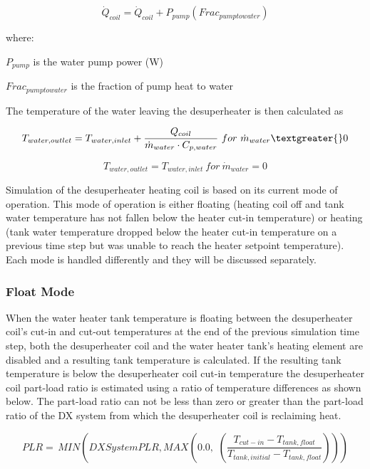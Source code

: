 \begin{equation}
{\dot Q_{coil}} = {\dot Q_{coil}} + {P_{pump}}\left( {Fra{c_{pumptowater}}} \right)
\end{equation}

where:

\({P_{pump}}\) is the water pump power (W)

\(Fra{c_{pumptowater}}\) is the fraction of pump heat to water

The temperature of the water leaving the desuperheater is then calculated as

\begin{equation}
{T_{water,outlet}} = {T_{water,inlet}} + \frac{{{Q_{coil}}}}{{{{\dot m}_{water}}\cdot {C_{p,water}}}} ~for~ {\dot m_{water}} \textgreater{} 0
\end{equation}

\begin{equation}
{T_{water,outlet}} = {T_{water,inlet}} ~for~ {\dot m_{water}} = 0
\end{equation}

Simulation of the desuperheater heating coil is based on its current mode of operation. This mode of operation is either floating (heating coil off and tank water temperature has not fallen below the heater cut-in temperature) or heating (tank water temperature dropped below the heater cut-in temperature on a previous time step but was unable to reach the heater setpoint temperature). Each mode is handled differently and they will be discussed separately.

\subsubsection{Float Mode}\label{float-mode}

When the water heater tank temperature is floating between the desuperheater coil's cut-in and cut-out temperatures at the end of the previous simulation time step, both the desuperheater coil and the water heater tank's heating element are disabled and a resulting tank temperature is calculated. If the resulting tank temperature is below the desuperheater coil cut-in temperature the desuperheater coil part-load ratio is estimated using a ratio of temperature differences as shown below. The part-load ratio can not be less than zero or greater than the part-load ratio of the DX system from which the desuperheater coil is reclaiming heat.

\begin{equation}
PLR = \,MIN\left( {DXSystemPLR,MAX\left( {0.0,\,\,\left( {\frac{{{T_{cut - in}} - {T_{tank,float}}}}{{{T_{tank,initial}} - {T_{tank,float}}}}} \right)} \right)} \right)
\end{equation}

